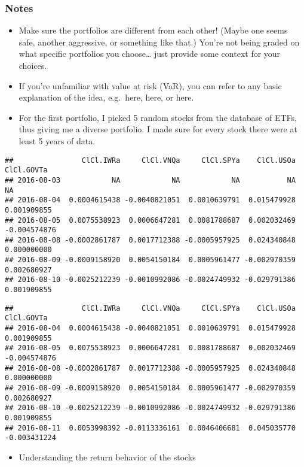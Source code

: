 \documentclass[
  12pt,
]{article}
\providecommand{\tightlist}{%
  \setlength{\itemsep}{0pt}\setlength{\parskip}{0pt}}
\begin{document}
\hypertarget{notes}{%
\subsubsection{Notes}\label{notes}}

\begin{itemize}
\item
  Make sure the portfolios are different from each other! (Maybe one
  seems safe, another aggressive, or something like that.) You're not
  being graded on what specific portfolios you choose\ldots{} just
  provide some context for your choices.
\item
  If you're unfamiliar with value at risk (VaR), you can refer to any
  basic explanation of the idea, e.g.~here, here, or here.
\item
  For the first portfolio, I picked 5 random stocks from the database of
  ETFs, thus giving me a diverse portfolio. I made sure for every stock
  there were at least 5 years of data.
\end{itemize}

\begin{verbatim}
##                ClCl.IWRa     ClCl.VNQa     ClCl.SPYa    ClCl.USOa   ClCl.GOVTa
## 2016-08-03            NA            NA            NA           NA           NA
## 2016-08-04  0.0004615438 -0.0040821051  0.0010639791  0.015479928  0.001909855
## 2016-08-05  0.0075538923  0.0006647281  0.0081788687  0.002032469 -0.004574876
## 2016-08-08 -0.0002861787  0.0017712388 -0.0005957925  0.024340848  0.000000000
## 2016-08-09 -0.0009158920  0.0054150184  0.0005961477 -0.002970359  0.002680927
## 2016-08-10 -0.0025212239 -0.0010992086 -0.0024749932 -0.029791386  0.001909855
\end{verbatim}

\begin{verbatim}
##                ClCl.IWRa     ClCl.VNQa     ClCl.SPYa    ClCl.USOa   ClCl.GOVTa
## 2016-08-04  0.0004615438 -0.0040821051  0.0010639791  0.015479928  0.001909855
## 2016-08-05  0.0075538923  0.0006647281  0.0081788687  0.002032469 -0.004574876
## 2016-08-08 -0.0002861787  0.0017712388 -0.0005957925  0.024340848  0.000000000
## 2016-08-09 -0.0009158920  0.0054150184  0.0005961477 -0.002970359  0.002680927
## 2016-08-10 -0.0025212239 -0.0010992086 -0.0024749932 -0.029791386  0.001909855
## 2016-08-11  0.0053998392 -0.0113336161  0.0046406681  0.045035770 -0.003431224
\end{verbatim}

\begin{itemize}
\tightlist
\item
  Understanding the return behavior of the stocks
\end{itemize}
\end{document}
